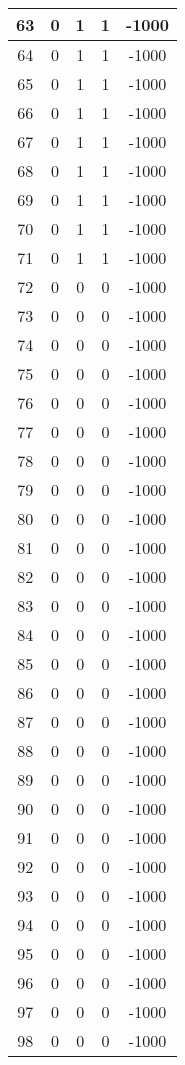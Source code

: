 \documentclass[letterpaper, 12pt]{article}
\begin{document}
\begin{longtable}{|c|c|c|c|c|}
\hline
63 & 0 & 1 & 1 & -1000 \\
\hline
64 & 0 & 1 & 1 & -1000 \\
\hline
65 & 0 & 1 & 1 & -1000 \\
\hline
66 & 0 & 1 & 1 & -1000 \\
\hline
67 & 0 & 1 & 1 & -1000 \\
\hline
68 & 0 & 1 & 1 & -1000 \\
\hline
69 & 0 & 1 & 1 & -1000 \\
\hline
70 & 0 & 1 & 1 & -1000 \\
\hline
71 & 0 & 1 & 1 & -1000 \\
\hline
72 & 0 & 0 & 0 & -1000 \\
\hline
73 & 0 & 0 & 0 & -1000 \\
\hline
74 & 0 & 0 & 0 & -1000 \\
\hline
75 & 0 & 0 & 0 & -1000 \\
\hline
76 & 0 & 0 & 0 & -1000 \\
\hline
77 & 0 & 0 & 0 & -1000 \\
\hline
78 & 0 & 0 & 0 & -1000 \\
\hline
79 & 0 & 0 & 0 & -1000 \\
\hline
80 & 0 & 0 & 0 & -1000 \\
\hline
81 & 0 & 0 & 0 & -1000 \\
\hline
82 & 0 & 0 & 0 & -1000 \\
\hline
83 & 0 & 0 & 0 & -1000 \\
\hline
84 & 0 & 0 & 0 & -1000 \\
\hline
85 & 0 & 0 & 0 & -1000 \\
\hline
86 & 0 & 0 & 0 & -1000 \\
\hline
87 & 0 & 0 & 0 & -1000 \\
\hline
88 & 0 & 0 & 0 & -1000 \\
\hline
89 & 0 & 0 & 0 & -1000 \\
\hline
90 & 0 & 0 & 0 & -1000 \\
\hline
91 & 0 & 0 & 0 & -1000 \\
\hline
92 & 0 & 0 & 0 & -1000 \\
\hline
93 & 0 & 0 & 0 & -1000 \\
\hline
94 & 0 & 0 & 0 & -1000 \\
\hline
95 & 0 & 0 & 0 & -1000 \\
\hline
96 & 0 & 0 & 0 & -1000 \\
\hline
97 & 0 & 0 & 0 & -1000 \\
\hline
98 & 0 & 0 & 0 & -1000 \\

\end{longtable}
\end{document}
